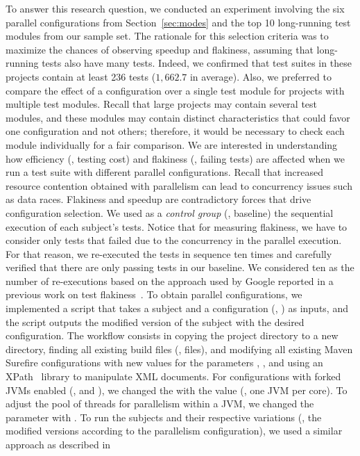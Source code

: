 To answer this research question, we conducted an experiment involving
the six parallel configurations from Section~\ref{sec:modes}  and the
top 10 long-running test modules from our sample set. The rationale
for this selection criteria was to maximize the chances of observing
speedup and flakiness, assuming that long-running tests also have many
tests. Indeed, we confirmed that test suites in these projects contain
at least 236 tests ($1,662.7$ in average). Also, we preferred to compare the
effect of a configuration over a single test module for projects with
multiple test modules.  Recall that large projects may contain several
test modules, and these modules may contain distinct characteristics
that could favor one configuration and not others; therefore, it would
be necessary to check each module individually for a fair comparison.
We are interested in understanding how efficiency (\ie, testing cost)
and flakiness (\ie, failing tests) are affected when we run a test
suite with different parallel configurations.  Recall that increased
resource contention obtained with parallelism can lead to concurrency
issues such as data races.  Flakiness and speedup are contradictory
forces that drive configuration selection.  We used as a \emph{control
group} (\ie, baseline) the sequential execution of each subject's
tests. Notice that for measuring flakiness, we have to consider only
tests that failed due to the concurrency in the parallel execution.
For that reason, we re-executed the tests in sequence ten times and
carefully verified that there are only passing tests in our baseline.
We considered ten as the number of re-executions based on the approach
used by Google reported in a previous work on test
flakiness~\cite{luo-etal-fse2014}.  To obtain parallel configurations,
we implemented a script that takes a subject and a configuration (\eg,
\ForkSeq{}) as inputs, and the script outputs the modified version of
the subject with the desired configuration. The workflow consists in
copying the project directory to a new directory, finding all existing
build files (\ie, \pomf{} files), and modifying all existing Maven
Surefire configurations with new values for the parameters
, , and  using
an XPath~\cite{xpath} library to manipulate XML documents. For
configurations with forked JVMs enabled (\ie, \ForkSeq{} and
\ForkParMeth{}), we changed the  with the value
 (\ie, one JVM per core).  To adjust the pool of threads
for parallelism within a JVM, we changed the parameter
 with .  To run the subjects and their respective variations
(\ie, the modified versions according to the parallelism
configuration), we used a similar approach as described in


